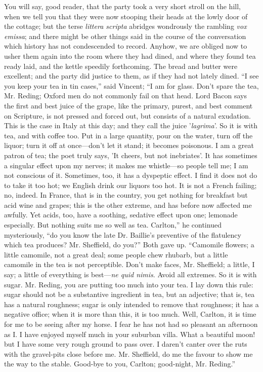 You will say, good reader, that the party took a very short stroll
on the hill, when we tell you that they were now stooping their heads
at the lowly door of the cottage; but the terse \emph{littera scripta}
abridges wondrously the rambling \emph{vox emissa}; and there might be
other things said in the course of the conversation which history has
not condescended to record. Anyhow, we are obliged now to usher them
again into the room where they had dined, and where they found tea
ready laid, and the kettle speedily forthcoming. The bread and butter
were excellent; and the party did justice to them, as if they had not
lately dined. ``I see you keep your tea in tin cases,'' said
Vincent; ``I am for glass. Don't spare the tea, Mr. Reding; Oxford
men do not commonly fail on that head. Lord Bacon says the first and
best juice of the grape, like the primary, purest, and best comment on
Scripture, is not pressed and forced out, but consists of a natural
exudation. This is the case in Italy at this day; and they call the
juice '\emph{lagrima}'. So it is with tea, and with coffee too. Put in
a large quantity, pour on the water, turn off the liquor; turn it off
at once—don't let it stand; it becomes poisonous. I am a great
patron of tea; the poet truly says, 'It cheers, but not inebriates'.
It has sometimes a singular effect upon my nerves; it makes me whistle—so
people tell me; I am not conscious of it. Sometimes, too, it has a
dyspeptic effect. I find it does not do to take it too hot; we English
drink our liquors too hot. It is not a French failing; no, indeed. In
France, that is in the country, you get nothing for breakfast but acid
wine and grapes; this is the other extreme, and has before now
affected me awfully. Yet acids, too, have a soothing, sedative effect
upon one; lemonade especially. But nothing suits me so well as tea.
Carlton,'' he continued mysteriously, ``do you know the late
Dr. Baillie's preventive of the flatulency which tea produces? Mr.
Sheffield, do you?'' Both gave up. ``Camomile flowers; a
little camomile, not a great deal; some people chew rhubarb, but a
little camomile in the tea is not perceptible. Don't make faces, Mr.
Sheffield; a little, I say; a little of everything is best—\emph{ne
quid nimis}. Avoid all extremes. So it is with sugar. Mr. Reding,
you are putting too much into your tea. I lay down this rule: sugar
should not be a substantive ingredient in tea, but an adjective; that
is, tea has a natural roughness; sugar is only intended to remove that
roughness; it has a negative office; when it is more than this, it is
too much. Well, Carlton, it is time for me to be seeing after my
horse. I fear he has not had so pleasant an afternoon as I. I have
enjoyed myself much in your suburban villa. What a beautiful moon! but
I have some very rough ground to pass over. I daren't canter over the
ruts with the gravel-pits close before me. Mr. Sheffield, do me the
favour to show me the way to the stable. Good-bye to you, Carlton;
good-night, Mr. Reding.''

